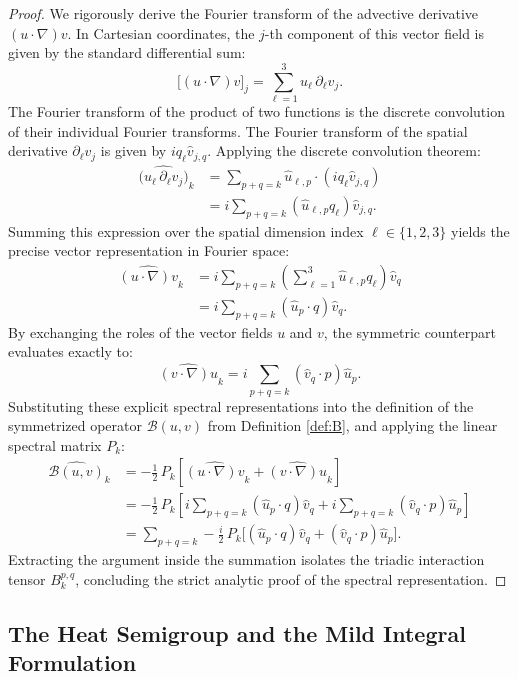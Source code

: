\documentclass[12pt,a4paper]{article}
\theoremstyle{plain}
\theoremstyle{definition}
\theoremstyle{remark}
\newcommand{\grad}{\nabla}
\newcommand{\BB}{\mathcal{B}}
\begin{document}
\begin{proof}
We rigorously derive the Fourier transform of the advective derivative $(u\cdot\grad)v$. In Cartesian coordinates, the $j$-th component of this vector field is given by the standard differential sum:
\[
  \big[(u\cdot\grad)v\big]_j = \sum_{\ell=1}^3 u_\ell\,\partial_\ell v_j.
\]
The Fourier transform of the product of two functions is the discrete convolution of their individual Fourier transforms. The Fourier transform of the spatial derivative $\partial_\ell v_j$ is given by $i q_\ell \hat{v}_{j,q}$. Applying the discrete convolution theorem:
\begin{align*}
  \widehat{\big(u_\ell\,\partial_\ell v_j\big)}_k
  &= \sum_{p+q=k} \hat{u}_{\ell,p} \cdot (i q_\ell \hat{v}_{j,q}) \\
  &= i \sum_{p+q=k} (\hat{u}_{\ell,p} q_\ell) \hat{v}_{j,q}.
\end{align*}
Summing this expression over the spatial dimension index $\ell \in \{1, 2, 3\}$ yields the precise vector representation in Fourier space:
\begin{align*}
  \widehat{(u\cdot\grad)v}_k
  &= i \sum_{p+q=k} \left( \sum_{\ell=1}^3 \hat{u}_{\ell,p} q_\ell \right) \hat{v}_{q} \\
  &= i \sum_{p+q=k} (\hat{u}_p \cdot q) \hat{v}_q.
\end{align*}
By exchanging the roles of the vector fields $u$ and $v$, the symmetric counterpart evaluates exactly to:
\[
  \widehat{(v\cdot\grad)u}_k = i \sum_{p+q=k} (\hat{v}_q \cdot p) \hat{u}_p.
\]
Substituting these explicit spectral representations into the definition of the symmetrized operator $\BB(u,v)$ from Definition \ref{def:B}, and applying the linear spectral matrix $P_k$:
\begin{align*}
  \widehat{\BB(u,v)}_k
  &= -\frac{1}{2}\,P_k \left[ \widehat{(u\cdot\grad)v}_k + \widehat{(v\cdot\grad)u}_k \right] \\
  &= -\frac{1}{2}\,P_k \left[ i \sum_{p+q=k} (\hat{u}_p \cdot q) \hat{v}_q + i \sum_{p+q=k} (\hat{v}_q \cdot p) \hat{u}_p \right] \\
  &= \sum_{p+q=k} -\frac{i}{2}\,P_k \Big[ (\hat{u}_p \cdot q) \hat{v}_q + (\hat{v}_q \cdot p) \hat{u}_p \Big].
\end{align*}
Extracting the argument inside the summation isolates the triadic interaction tensor $B_k^{p,q}$, concluding the strict analytic proof of the spectral representation.
\end{proof}

\subsection{The Heat Semigroup and the Mild Integral Formulation}
\label{subsec:semigroup_mild}
\end{document}
